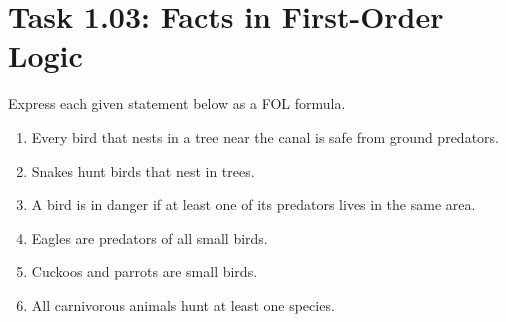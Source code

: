 \documentclass[11pt,a4paper]{article}
\begin{document}
\section*{Task 1.03: Facts in First-Order Logic}

Express each given statement below as a FOL formula.

\begin{enumerate}
	\item Every bird that nests in a tree near the canal is safe from ground predators.
	\item Snakes hunt birds that nest in trees.
	\item A bird is in danger if at least one of its predators lives in the same area.
	\item Eagles are predators of all small birds.
	\item Cuckoos and parrots are small birds.
	\item All carnivorous animals hunt at least one species.
\end{enumerate}
\end{document}

